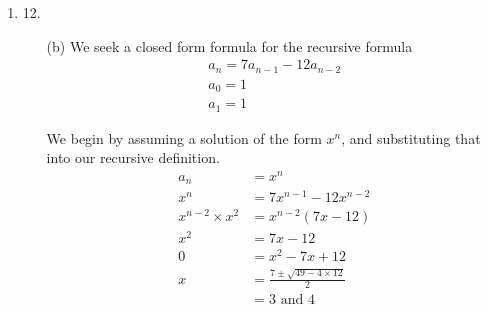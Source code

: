 \documentclass[fleqn]{article}
\newenvironment{answers}{ %
	\begin{enumerate}
		\setlength{\itemsep}{\bigskipamount}
}{\end{enumerate}}
\begin{document}
\begin{answers}
\begin{enumerate}
		To begin, we can juxtapose a vertical \(2 \times 1\) tile with any of the \(t_{n-1}\) board configurations of size \(2 \times (n-1)\), as shown in Figure \ref{7b_1}. That gives us so far \(t_{n-1}\) ways.

		\begin{figure}[h]
			\centering
			\caption{A board of size \(2 \times n\) made by appending a vertical \(2 \times 1\) tile to an arbitrary board of size \(2 \times (n-1)\).}
			\label{7b_1}
		\end{figure}

		Besides for these \(t_{n-1}\) ways, we also can exchange the last tile of any of the \(2 \times (n-1)\) sized boards which ended with a vertical \(2 \times 1\) tile with a \(2 \times 2\) tile or with two horizontal \(2 \times 1\) tiles. The number of such tiles which ended with a vertical \(2 \times 1\) tile is precisely the same as the number of tiles of size \(2 \times (n-2)\), since each of those was appended with a vertical tile to obtain a \(2 \times (n-1)\) sized tile. This is equal to \(t_{n-2}\). Since we can exchange any of these \(t_{n-2}\) tiles in two ways to form two distinct tilings, we must multiply \(t_{n-1}\) by two.

		Thus we have our recursive formula
		\begin{gather*}
			t_n = t_{n-1} + 2t_{n-2} \\
			t_0 = 1 \\
			t_1 = 1
		\end{gather*}
	\end{enumerate}

	\item[12.]
	\begin{enumerate}
		\item[(b)]
		We seek a closed form formula for the recursive formula
		\begin{gather*}
			a_n = 7a_{n-1} - 12a_{n-2} \\
			a_0 = 1 \\
			a_1 = 1
		\end{gather*}

		We begin by assuming a solution of the form \(x^n\), and substituting that into our recursive definition.
		\begin{align*}
			a_n &= x^n \\
			x^n &= 7x^{n-1} - 12x^{n-2} \\
			x^{n-2} \times x^2 &= x^{n-2} (7x - 12) \\
			x^2 &= 7x - 12 \\
			0 &= x^2 - 7x + 12 \\
			x &= \frac{7 \pm \sqrt{49 - 4 \times 12}}{2} \\
			&= 3 \text{ and } 4
		\end{align*}


\end{enumerate}
\end{answers}
\end{document}
